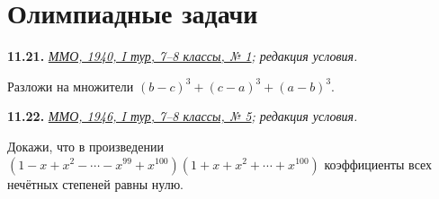 \par{}\section*{Олимпиадные задачи}
\noindent\begin{minipage}[t]{\linewidth}\textbf{11.21.} {\small\itshape\href{https://mmo.mccme.ru/books/mmo-35-57.pdf}{ММО, 1940, I тур, 7–8 классы, № 1}; редакция условия.}\par Разложи на множители \((b-c)^3+(c-a)^3+(a-b)^3\).\par\end{minipage}\par
\noindent\begin{minipage}[t]{\linewidth}\textbf{11.22.} {\small\itshape\href{https://mmo.mccme.ru/books/mmo-35-57.pdf}{ММО, 1946, I тур, 7–8 классы, № 5}; редакция условия.}\par Докажи, что в произведении \((1-x+x^2-\cdots-x^{99}+x^{100})(1+x+x^2+\cdots+x^{100})\) коэффициенты всех нечётных степеней равны нулю.\par\end{minipage}\par
\endgroup
